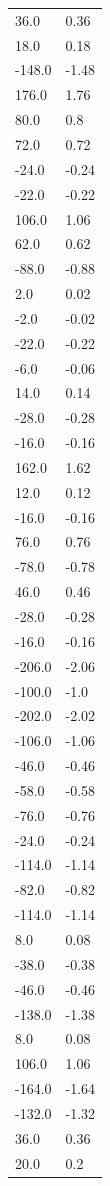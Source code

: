 \begin{longtable}{ll}
36.0 & 0.36 \\
18.0 & 0.18 \\
-148.0 & -1.48 \\
176.0 & 1.76 \\
80.0 & 0.8 \\
72.0 & 0.72 \\
-24.0 & -0.24 \\
-22.0 & -0.22 \\
106.0 & 1.06 \\
62.0 & 0.62 \\
-88.0 & -0.88 \\
2.0 & 0.02 \\
-2.0 & -0.02 \\
-22.0 & -0.22 \\
-6.0 & -0.06 \\
14.0 & 0.14 \\
-28.0 & -0.28 \\
-16.0 & -0.16 \\
162.0 & 1.62 \\
12.0 & 0.12 \\
-16.0 & -0.16 \\
76.0 & 0.76 \\
-78.0 & -0.78 \\
46.0 & 0.46 \\
-28.0 & -0.28 \\
-16.0 & -0.16 \\
-206.0 & -2.06 \\
-100.0 & -1.0 \\
-202.0 & -2.02 \\
-106.0 & -1.06 \\
-46.0 & -0.46 \\
-58.0 & -0.58 \\
-76.0 & -0.76 \\
-24.0 & -0.24 \\
-114.0 & -1.14 \\
-82.0 & -0.82 \\
-114.0 & -1.14 \\
8.0 & 0.08 \\
-38.0 & -0.38 \\
-46.0 & -0.46 \\
-138.0 & -1.38 \\
8.0 & 0.08 \\
106.0 & 1.06 \\
-164.0 & -1.64 \\
-132.0 & -1.32 \\
36.0 & 0.36 \\
20.0 & 0.2 \\

\end{longtable}
